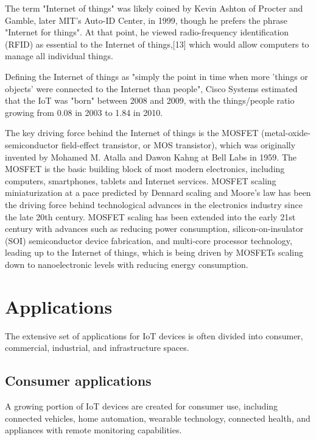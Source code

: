 \documentclass[12pt, a4paper, twoside]{article}
\begin{document}
The term "Internet of things" was likely coined by Kevin Ashton of Procter and Gamble, later MIT's Auto-ID Center, in 1999, though he prefers the phrase "Internet for things". At that point, he viewed radio-frequency identification (RFID) as essential to the Internet of things,[13] which would allow computers to manage all individual things.

Defining the Internet of things as "simply the point in time when more 'things or objects' were connected to the Internet than people", Cisco Systems estimated that the IoT was "born" between 2008 and 2009, with the things/people ratio growing from 0.08 in 2003 to 1.84 in 2010.

The key driving force behind the Internet of things is the MOSFET (metal-oxide-semiconductor field-effect transistor, or MOS transistor), which was originally invented by Mohamed M. Atalla and Dawon Kahng at Bell Labs in 1959. The MOSFET is the basic building block of most modern electronics, including computers, smartphones, tablets and Internet services. MOSFET scaling miniaturization at a pace predicted by Dennard scaling and Moore's law has been the driving force behind technological advances in the electronics industry since the late 20th century. MOSFET scaling has been extended into the early 21st century with advances such as reducing power consumption, silicon-on-insulator (SOI) semiconductor device fabrication, and multi-core processor technology, leading up to the Internet of things, which is being driven by MOSFETs scaling down to nanoelectronic levels with reducing energy consumption.

\section{Applications}
The extensive set of applications for IoT devices is often divided into consumer, commercial, industrial, and infrastructure spaces.
\subsection{Consumer applications}
A growing portion of IoT devices are created for consumer use, including connected vehicles, home automation, wearable technology, connected health, and appliances with remote monitoring capabilities.
\end{document}
